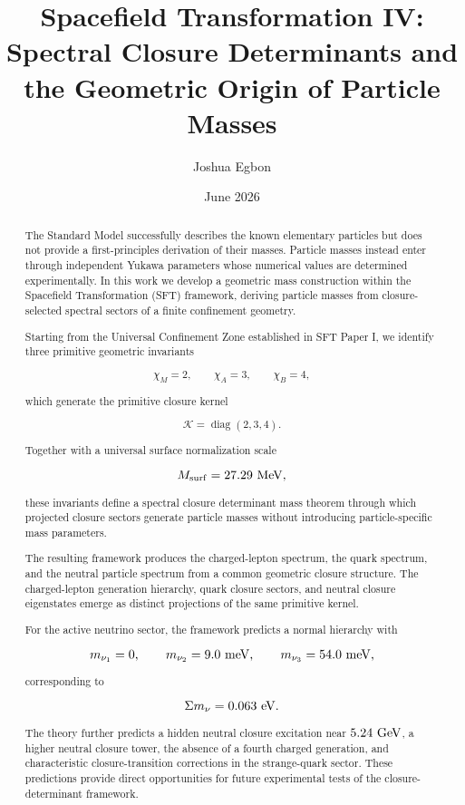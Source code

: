 \documentclass[11pt]{article}
\title{Spacefield Transformation IV: Spectral Closure Determinants and the Geometric Origin of Particle Masses}
\author{Joshua Egbon}
\date{June 2026}
\theoremstyle{definition}
\theoremstyle{remark}
\begin{document}
\maketitle

\begin{abstract}

The Standard Model successfully describes the known elementary
particles but does not provide a first-principles derivation of
their masses. Particle masses instead enter through independent
Yukawa parameters whose numerical values are determined
experimentally. In this work we develop a geometric mass
construction within the Spacefield Transformation (SFT)
framework, deriving particle masses from closure-selected
spectral sectors of a finite confinement geometry.

Starting from the Universal Confinement Zone established in SFT
Paper I, we identify three primitive geometric invariants

\[
\chi_M=2,
\qquad
\chi_A=3,
\qquad
\chi_B=4,
\]

which generate the primitive closure kernel

\[
\mathcal K =
\operatorname{diag}(2,3,4).
\]

Together with a universal surface normalization scale

\[
M_{\rm surf} =
27.29~{\rm MeV},
\]

these invariants define a spectral closure determinant mass
theorem through which projected closure sectors generate
particle masses without introducing particle-specific mass
parameters.

The resulting framework produces the charged-lepton spectrum,
the quark spectrum, and the neutral particle spectrum from a
common geometric closure structure. The charged-lepton
generation hierarchy, quark closure sectors, and neutral
closure eigenstates emerge as distinct projections of the same
primitive kernel.

For the active neutrino sector, the framework predicts a normal
hierarchy with

\[
m_{\nu_1}=0,
\qquad
m_{\nu_2}=9.0~{\rm meV},
\qquad
m_{\nu_3}=54.0~{\rm meV},
\]

corresponding to

\[
\Sigma m_\nu =
0.063~{\rm eV}.
\]

The theory further predicts a hidden neutral closure excitation
near \(5.24~{\rm GeV}\), a higher neutral closure tower, the
absence of a fourth charged generation, and characteristic
closure-transition corrections in the strange-quark sector.
These predictions provide direct opportunities for future
experimental tests of the closure-determinant framework.

\end{abstract}
\end{document}
